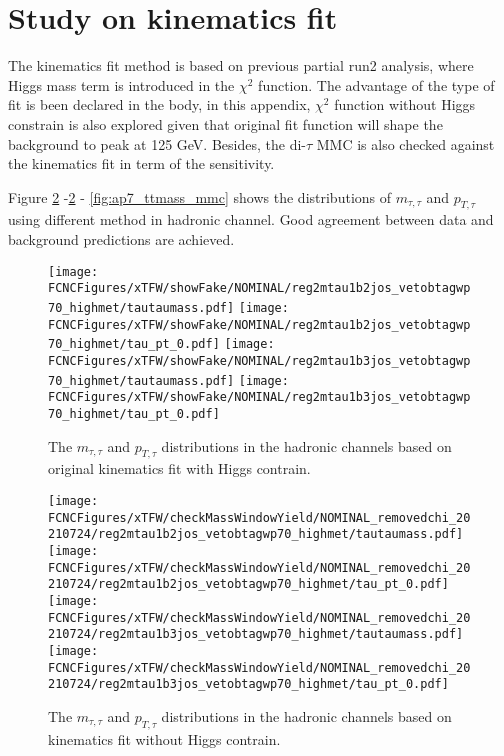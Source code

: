\section{Study on kinematics fit}
\label{sec:kine}

The kinematics fit method is based on previous partial run2 analysis, where Higgs mass term is introduced in the $\chi^2$ function. 
The advantage of the type of fit is been declared in the body, in this appendix, $\chi^2$ function without Higgs constrain is also explored given that original fit function
will shape the background to peak at 125 GeV. Besides, the di-$\tau$ MMC is also checked against the kinematics fit in term of the sensitivity.

Figure \ref{fig:ap7_ttmass_removedchi2} -\ref{fig:ap7_ttmass_removedchi2} - \ref{fig:ap7_ttmass_mmc} shows the distributions of $m_{\tau,\tau}$ and $p_{T,\tau}$ using different method in hadronic channel. Good agreement between data and background predictions are achieved.


\begin{figure}[H]
\centering
\texttt{[image: \\FCNCFigures/xTFW/showFake/NOMINAL/reg2mtau1b2jos\_vetobtagwp70\_highmet/tautaumass.pdf]}
\texttt{[image: \\FCNCFigures/xTFW/showFake/NOMINAL/reg2mtau1b2jos\_vetobtagwp70\_highmet/tau\_pt\_0.pdf]}
\texttt{[image: \\FCNCFigures/xTFW/showFake/NOMINAL/reg2mtau1b3jos\_vetobtagwp70\_highmet/tautaumass.pdf]}
\texttt{[image: \\FCNCFigures/xTFW/showFake/NOMINAL/reg2mtau1b3jos\_vetobtagwp70\_highmet/tau\_pt\_0.pdf]}
\caption{ The $m_{\tau,\tau}$ and $p_{T,\tau}$ distributions in the hadronic channels based on original kinematics fit with Higgs contrain.}
\label{fig:ap7_ttmass_originalchi2}
\end{figure}


\begin{figure}[H]
\centering
\texttt{[image: \\FCNCFigures/xTFW/checkMassWindowYield/NOMINAL\_removedchi\_20210724/reg2mtau1b2jos\_vetobtagwp70\_highmet/tautaumass.pdf]}
\texttt{[image: \\FCNCFigures/xTFW/checkMassWindowYield/NOMINAL\_removedchi\_20210724/reg2mtau1b2jos\_vetobtagwp70\_highmet/tau\_pt\_0.pdf]}
\texttt{[image: \\FCNCFigures/xTFW/checkMassWindowYield/NOMINAL\_removedchi\_20210724/reg2mtau1b3jos\_vetobtagwp70\_highmet/tautaumass.pdf]}
\texttt{[image: \\FCNCFigures/xTFW/checkMassWindowYield/NOMINAL\_removedchi\_20210724/reg2mtau1b3jos\_vetobtagwp70\_highmet/tau\_pt\_0.pdf]}
\caption{ The $m_{\tau,\tau}$ and $p_{T,\tau}$ distributions in the hadronic channels based on kinematics fit without Higgs contrain.}
\label{fig:ap7_ttmass_removedchi2}
\end{figure}

